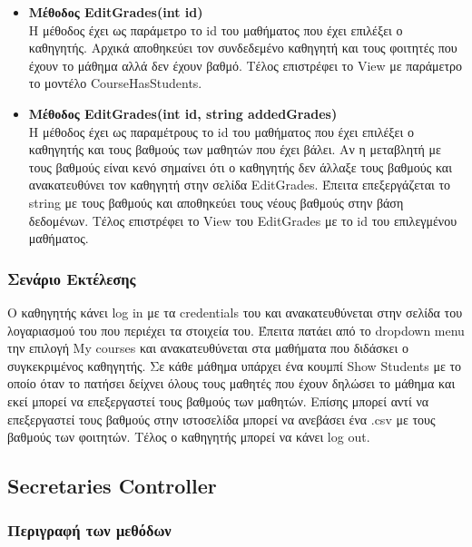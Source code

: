 \documentclass[12pt]{article}
\begin{document}
\begin{itemize}
	\item \textbf{Μέθοδος EditGrades(int id)}\\
	Η μέθοδος έχει ως παράμετρο το id του μαθήματος που έχει επιλέξει ο καθηγητής. Αρχικά αποθηκεύει τον συνδεδεμένο καθηγητή και τους φοιτητές που έχουν το μάθημα αλλά δεν έχουν βαθμό. Τέλος επιστρέφει το View με παράμετρο το μοντέλο CourseHasStudents.		
	
	\item \textbf{Μέθοδος EditGrades(int id, string addedGrades)}\\
	Η μέθοδος έχει ως παραμέτρους το id  του μαθήματος που έχει επιλέξει ο καθηγητής και τους βαθμούς των μαθητών που έχει βάλει. Αν η μεταβλητή με τους βαθμούς είναι κενό σημαίνει ότι ο καθηγητής δεν άλλαξε τους βαθμούς και ανακατευθύνει τον καθηγητή στην σελίδα EditGrades. Έπειτα επεξεργάζεται το string με τους βαθμούς και αποθηκεύει τους νέους βαθμούς στην βάση δεδομένων. Τέλος επιστρέφει το View του EditGrades με το id του επιλεγμένου μαθήματος.		
				
\end{itemize}

\subsubsection{Σενάριο Εκτέλεσης}
Ο καθηγητής κάνει log in με τα credentials του και ανακατευθύνεται στην σελίδα του λογαριασμού του που περιέχει τα στοιχεία του. Έπειτα πατάει από το dropdown menu την επιλογή My courses και ανακατευθύνεται στα μαθήματα που διδάσκει ο συγκεκριμένος καθηγητής. Σε κάθε μάθημα υπάρχει ένα κουμπί Show Students με το οποίο όταν το πατήσει δείχνει όλους τους μαθητές που έχουν δηλώσει το μάθημα και εκεί μπορεί να επεξεργαστεί τους βαθμούς των μαθητών. Επίσης μπορεί αντί να επεξεργαστεί τους βαθμούς στην ιστοσελίδα μπορεί να ανεβάσει ένα .csv με τους βαθμούς των φοιτητών. Τέλος ο καθηγητής μπορεί να κάνει log out.

\subsection{Secretaries Controller}



\subsubsection{Περιγραφή των μεθόδων}
\end{document}
